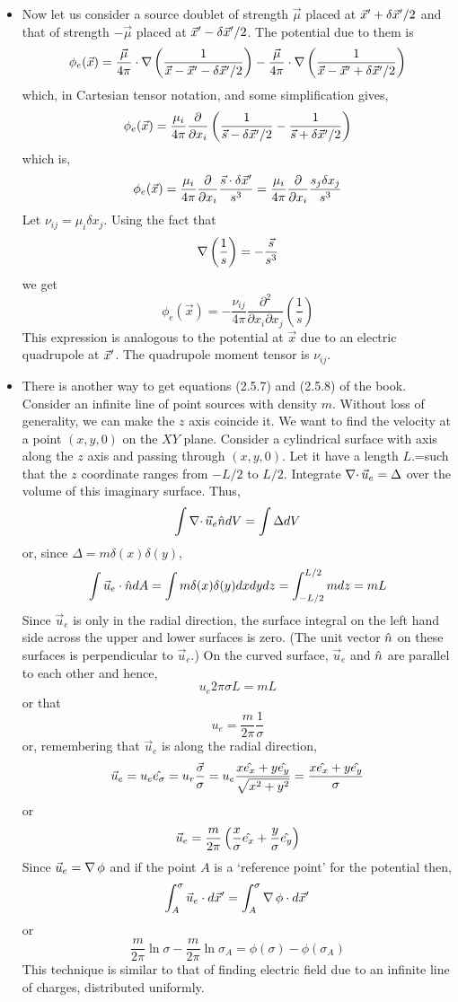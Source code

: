 \begin{itemize}
\item Now let us consider a source doublet of strength $\vec{\mu}$ placed at $\vec{x}^\prime + \delta\vec{x}^\prime/2$ and that of strength $-\vec{\mu}$ placed at 
$\vec{x}^\prime - \delta\vec{x}^\prime/2$. The potential due to them is
\[
\phi_e(\vec{x}) = \frac{\vec{\mu}}{4\pi}\cdot\operatorname{\nabla}{\left(\frac{1}{\vec{x} - \vec{x}^\prime - \delta\vec{x}^\prime/2}\right)} - 
 \frac{\vec{\mu}}{4\pi}\cdot\operatorname{\nabla}{\left(\frac{1}{\vec{x} - \vec{x}^\prime + \delta\vec{x}^\prime/2}\right)}
\]
which, in Cartesian tensor notation, and some simplification gives,
\[
\phi_e(\vec{x}) = \frac{\mu_i}{4\pi}\frac{\partial}{\partial x_i}\left(\frac{1}{\vec{s} - \delta\vec{x}^\prime/2} - \frac{1}{\vec{s} + \delta\vec{x}^\prime/2}\right)
\]
which is,
\[
\phi_e(\vec{x}) = \frac{\mu_i}{4\pi}\frac{\partial}{\partial x_i}\frac{\vec{s}\cdot\delta\vec{x}^\prime}{s^3} = \frac{\mu_i}{4\pi}\frac{\partial}{\partial x_i}\frac{s_j\delta x_j}{s^3}
\]
Let $\nu_{ij} = \mu_i \delta x_j$. Using the fact that
\[
\operatorname{\nabla}{\left(\frac{1}{s}\right)} = -\frac{\vec{s}}{s^3}
\]
we get
\[
\phi_e(\vec{x}) = -\frac{\nu_{ij}}{4\pi}\frac{\partial^2}{\partial x_i \partial x_j}\left(\frac{1}{s}\right)
\]
This expression is analogous to the potential at $\vec{x}$ due to an electric quadrupole at $\vec{x}^\prime$. The quadrupole moment tensor is $\nu_{ij}$.

\item There is another way to get equations (2.5.7) and (2.5.8) of the book. Consider an infinite line of point sources with density $m$. Without loss of generality, we can make the $z$ 
axis coincide it. We want to find the velocity at a point $(x, y, 0)$ on the $XY$ plane. Consider a cylindrical surface with axis along the $z$ axis and passing through $(x, y, 0)$. Let 
it have a length $L$.=such that the $z$ coordinate ranges from $-L/2$ to $L/2$. Integrate $\operatorname{\nabla\cdot}{\vec{u}_e} = \Delta$ over the volume of this imaginary surface. Thus,
\[
\int\operatorname{\nabla\cdot}{\vec{u}_e}\hat{n} dV = \int\Delta dV
\]
or, since $\Delta = m\delta(x)\delta(y)$,
\[
\int\vec{u}_e\cdot\hat{n} dA = \int m\delta(x)\delta(y) dx dy dz = \int_{-L/2}^{L/2} mdz = mL
\]
Since $\vec{u}_e$ is only in the radial direction, the surface integral on the left hand side across the upper and lower surfaces is zero. (The unit vector $\hat{n}$ on these surfaces is
perpendicular to $\vec{u}_e$.) On the curved surface, $\vec{u}_e$ and $\hat{n}$ are parallel to each other and hence,
\[
u_e 2\pi\sigma L = mL
\]
or that 
\[
u_e = \frac{m}{2\pi} \frac{1}{\sigma}
\]
or, remembering that $\vec{u}_e$ is along the radial direction,
\[
\vec{u}_e = u_e \hat{e_{\sigma}} = u_r \frac{\vec{\sigma}}{\sigma} = u_e \frac{x\hat{e_{x}} + y\hat{e_{y}}}{\sqrt{x^2 + y^2}} = \frac{x\hat{e_{x}} + y\hat{e_{y}}}{\sigma}
\]
or
\[
\vec{u}_e = \frac{m}{2\pi} \left(\frac{x}{\sigma}\hat{e_{x}} + \frac{y}{\sigma}\hat{e_{y}}\right)
\]
Since $\vec{u}_e = \operatorname{\nabla}{\phi}$ and if the point $A$ is a \enquote*{reference point} for the potential then,
\[
\int_A^{\sigma} \vec{u}_e\cdot d\vec{x}^\prime = \int_A^{\sigma} \operatorname{\nabla}{\phi}\cdot d\vec{x}^\prime
\]
or
\[
\frac{m}{2\pi} \ln\sigma - \frac{m}{2\pi} \ln\sigma_A = \phi(\sigma) - \phi(\sigma_A)
\]
This technique is similar to that of finding electric field due to an infinite line of charges, distributed uniformly.
\end{itemize}

